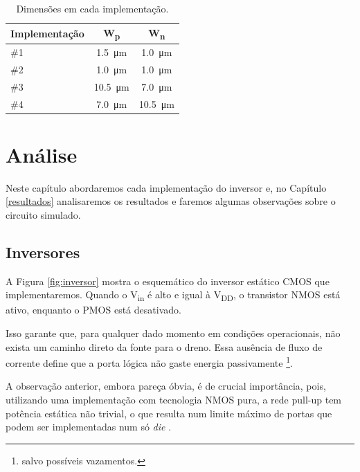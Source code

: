 \documentclass{iiufrgs}
\begin{document}
\begin{table}[ht]
    \centering
    \caption{Dimensões em cada implementação.}
    \label{tab:imp}
    \begin{tabular}{l c c}
        \hline
        Implementação
        & W\textsubscript{p}
        & W\textsubscript{n} \\ \hline
        \#1 & \SI{1.5}{\um}     & \SI{1.0}{\um}     \\ 
        \#2 & \SI{1.0}{\um}     & \SI{1.0}{\um}     \\ 
        \#3 & \SI{10.5}{\um}    & \SI{7.0}{\um}     \\ 
        \#4 & \SI{7.0}{\um}     & \SI{10.5}{\um}    \\ \hline
    \end{tabular}
\end{table}

\chapter{Análise}\label{analise}
Neste capítulo abordaremos cada implementação do inversor e, no Capítulo \ref{resultados} analisaremos os resultados e faremos algumas observações sobre o circuito simulado.

\section{Inversores}
A Figura \ref{fig:inversor} mostra o esquemático do inversor estático CMOS que implementaremos. Quando o V\textsubscript{in} é alto e igual à V\textsubscript{DD}, o transistor NMOS está ativo, enquanto o PMOS está desativado.\

Isso garante que, para qualquer dado momento em condições operacionais, não exista um caminho direto da fonte para o dreno. Essa ausência de fluxo de corrente define que a porta lógica não gaste energia passivamente \footnote{salvo possíveis vazamentos.}.\

A observação anterior, embora pareça óbvia, é de crucial importância, pois, utilizando uma implementação com tecnologia NMOS pura, a rede pull-up tem potência estática não trivial, o que resulta num limite máximo de portas que podem ser implementadas num só \textit{die} \cite{Rabaey1996Circuits}.\
\end{document}
